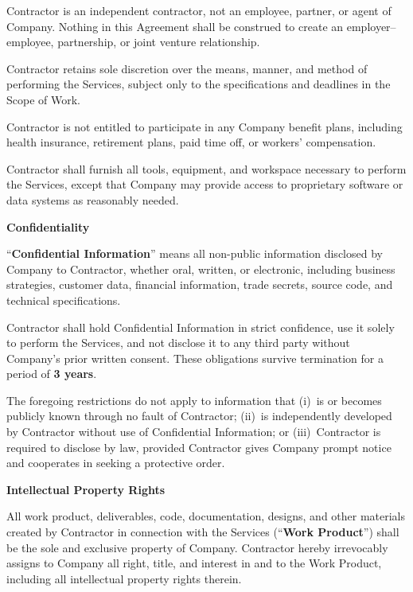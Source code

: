 \documentclass[10pt]{article}
\newcounter{artcnt}
\newcommand{\article}[1]{%
  \stepcounter{artcnt}%
  \vspace{11pt}%
  \noindent\makebox[22pt][l]{{\color{accent}\bfseries\Large\theartcnt.}}%
  {\color{accent}\bfseries\large#1}%
  \vspace{3pt}\par%
}
\newcommand{\cl}[1]{%
  \par\vspace{2pt}\noindent{\color{accent}\bfseries(#1)}\enspace%
}
\begin{document}
Contractor is an independent contractor, not an employee, partner, or agent of Company. Nothing in this Agreement shall be construed to create an employer--employee, partnership, or joint venture relationship.

\cl{a} Contractor retains sole discretion over the means, manner, and method of performing the Services, subject only to the specifications and deadlines in the Scope of Work.

\cl{b} Contractor is not entitled to participate in any Company benefit plans, including health insurance, retirement plans, paid time off, or workers' compensation.

\cl{c} Contractor shall furnish all tools, equipment, and workspace necessary to perform the Services, except that Company may provide access to proprietary software or data systems as reasonably needed.

\article{Confidentiality}

\cl{a} ``\textbf{Confidential Information}'' means all non-public information disclosed by Company to Contractor, whether oral, written, or electronic, including business strategies, customer data, financial information, trade secrets, source code, and technical specifications.

\cl{b} Contractor shall hold Confidential Information in strict confidence, use it solely to perform the Services, and not disclose it to any third party without Company's prior written consent. These obligations survive termination for a period of \textbf{3 years}.

\cl{c} The foregoing restrictions do not apply to information that (i)~is or becomes publicly known through no fault of Contractor; (ii)~is independently developed by Contractor without use of Confidential Information; or (iii)~Contractor is required to disclose by law, provided Contractor gives Company prompt notice and cooperates in seeking a protective order.

\article{Intellectual Property Rights}

All work product, deliverables, code, documentation, designs, and other materials created by Contractor in connection with the Services (``\textbf{Work Product}'') shall be the sole and exclusive property of Company. Contractor hereby irrevocably assigns to Company all right, title, and interest in and to the Work Product, including all intellectual property rights therein.
\end{document}
